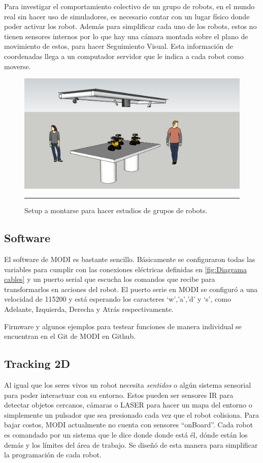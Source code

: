 Para investigar el comportamiento colectivo de un grupo de robots, en el mundo real sin hacer uso de simuladores, es necesario contar con un lugar físico donde poder activar los robot. Además para simplificar cada uno de los robots, estos no tienen sensores internos por lo que hay una cámara montada sobre el plano de movimiento de estos, para hacer Seguimiento Visual. Esta información de coordenadas llega a un computador servidor que le indica a cada robot como moverse.
\begin{figure}[htbp]
	\centering
		\includegraphics[width=\textwidth]{./Figures/setup.png}
		\rule{35em}{0.5pt}
	\caption[Setup Enjambre MODI]{Setup a montarse para hacer estudios de grupos de robots.}
	\label{fig:setup}
\end{figure}

\subsection{Software}

El software de MODI es bastante sencillo. Básicamente se configuraron todas las variables para cumplir con las conexiones eléctricas definidas en \ref{fig:Diagrama cables} y un puerto serial que escucha los comandos que recibe para transformarlos en acciones del robot. El puerto serie en MODI se configuró a una velocidad de 115200 y está esperando los caracteres ‘w’,’a’,’d’ y ‘s’, como Adelante, Izquierda, Derecha y Atrás respectivamente. 

Firmware y algunos ejemplos para testear funciones de manera individual se encuentran en el Git de MODI en Github.


\subsection{Tracking 2D}
Al igual que los seres vivos un robot necesita \textit{sentidos} o algún sistema sensorial para poder interactuar con su entorno. Estos pueden ser sensores IR para detectar objetos cercanos, cámaras o LASER para hacer un mapa del entorno o simplemente un pulsador que sea presionado cada vez que el robot colisiona. Para bajar costos, MODI actualmente no cuenta con sensores “onBoard”. Cada robot es comandado por un sistema que le dice donde donde está él, dónde están los demás y los límites del área de trabajo. Se diseñó de esta manera para simplificar la programación de cada robot.

